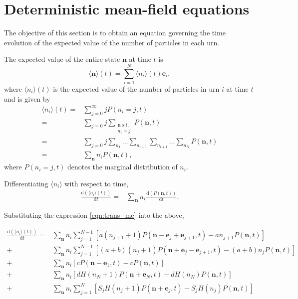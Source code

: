 \documentclass[a4paper,11pt]{article}
\numberwithin{equation}{section}
\newcommand{\diff}[2]{\frac{\mathrm{d} #1}{\mathrm{d} #2}}
\newcommand{\V}[1]{\mathbf{#1}}
\newcommand{\E}[1]{\langle #1 \rangle}
\begin{document}
\section{Deterministic mean-field equations}
The objective of this section is to obtain an equation governing the time
evolution of the expected value of the number of particles in each urn.

The expected value of the entire state \(\V{n}\) at time \(t\) is
\begin{equation*}
    \E{\V{n}}(t) = \sum_{i=1}^N \langle n_i \rangle(t) \V{e}_i,
\end{equation*}
where \(\E{n_i}(t)\) is the expected value of the number of particles in urn
\(i\) at time \(t\) and is given by
\begin{align*}
    \E{n_i}(t) =& \sum_{j=0}^\infty j P(n_i = j,t)\\
    =& \sum_{j=0} j
    \sum_{\substack{\V{n} \text{ s.t.} \\ n_i=j}} P(\V{n},t)\\
    =& \sum_{j=0} j
    \sum_{n_1} \dotso \sum_{n_{i-1}} \sum_{n_{i+1}} \dotso \sum_{n_N} P(\V{n},t)\\
    =& \sum_{\V{n}} n_i P(\V{n},t),
\end{align*}
where \(P(n_i = j,t)\) denotes the marginal distribution of \(n_i\).

Differentiating \(\E{n_i}\) with respect to time,
\begin{align*}
    \diff{(\E{n_i}(t))}{t} =& \sum_{\V{n}} n_i \diff{(P(\V{n},t))}{t}.
\end{align*}

Substituting the expression \eqref{eqn:trans_me} into the above,

\begin{subequations}
\begin{align}
    \label{eqn:trans_expectation_hl_term}
    \diff{(\E{n_i}(t))}{t}
    = & \sum_\V{n} n_i \sum_{j=1}^{N-1}
    \left[a(n_{j+1}+1) P(\V{n} - \V{e}_j + \V{e}_{j+1},t) -
        an_{j+1} P(\V{n},t)\right] \\
    \label{eqn:trans_expectation_hr_term}
    + & \sum_\V{n} n_i \sum_{j=1}^{N-1}
    \left[(a+b)(n_j+1) P(\V{n} + \V{e}_j - \V{e}_{j+1},t) -
        (a+b)n_j P(\V{n},t)\right] \\
    \label{eqn:trans_expectation_in_term}
    + & \sum_\V{n} n_i
    \left[c P(\V{n} - \V{e}_1,t) - c P(\V{n},t)\right] \\
    \label{eqn:trans_expectation_out_term}
    + & \sum_\V{n} n_i
    \left[d H(n_N+1) P(\V{n} + \V{e}_N,t) - d H(n_N) P(\V{n},t)\right] \\
    \label{eqn:trans_expectation_rem_term}
    + & \sum_\V{n} n_i \sum_{j=1}^{N}
    \left[S_j H(n_j + 1) P(\V{n} + \V{e}_j,t) - S_j H(n_j) P(\V{n},t)\right]
\end{align}
\end{subequations}
\end{document}
